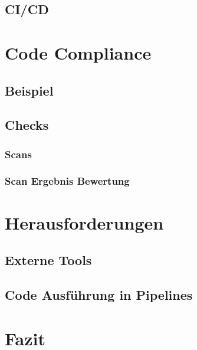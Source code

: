 \documentclass[
	12pt, %
	a4paper,
	bibliography=totoc, %
	numbers=noenddot, %
	ngerman, %
	headsepline, %
	oneside %
	]{scrbook} %
\begin{document}
\section{CI/CD}\label{sec:cicd}


\chapter{Code Compliance}\label{ch:code_compliance}


\section{Beispiel}\label{sec:compliance_beispiele}


\section{Checks}\label{se~:checks}


\subsection{Scans}\label{subsec:scans}


\subsection{Scan Ergebnis Bewertung}\label{subsec:scan_bewertung}


\chapter{Herausforderungen}\label{ch:herausforderungen}


\section{Externe Tools}\label{sec:externe_tools}


\section{Code Ausführung in Pipelines}\label{sec:code_beispiel}


\chapter{Fazit}\label{ch:fazit}

\end{document}
